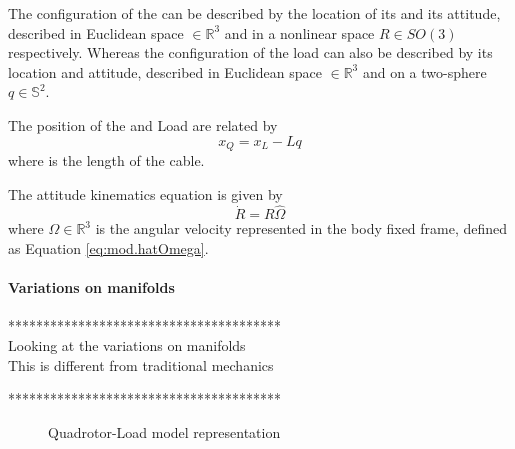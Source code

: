 The configuration of the  can be described by the location of its  and its attitude, described in Euclidean space $\in \mathbb{R}^3 $ and in a nonlinear space $R\in SO(3) $ respectively. Whereas the configuration of the load can also be described by its location and attitude, described in Euclidean space $\in \mathbb{R}^3 $ and on a two-sphere $ q\in \mathbb{S}^2 $.

The position of the  and Load are related by
\begin{equation}\label{eq:xQ2xL}
x_Q=x_L-Lq
\end{equation}
where  is the length of the cable.

The attitude kinematics equation is given by
\begin{equation}\label{key}
\dot{R}=R\hat{\Omega}
\end{equation}
where $ \Omega\in\mathbb{R}^3 $ is the angular velocity represented in the body fixed frame, defined as Equation \ref{eq:mod.hatOmega}.

\paragraph{Variations on manifolds}

***************************************\\
Looking at the variations on manifolds\\
This is different from traditional mechanics

***************************************\\


\begin{figure}[h!]
	\centering
	\caption{Quadrotor-Load model representation\label{fig:QRLmodel}}
\end{figure}		




